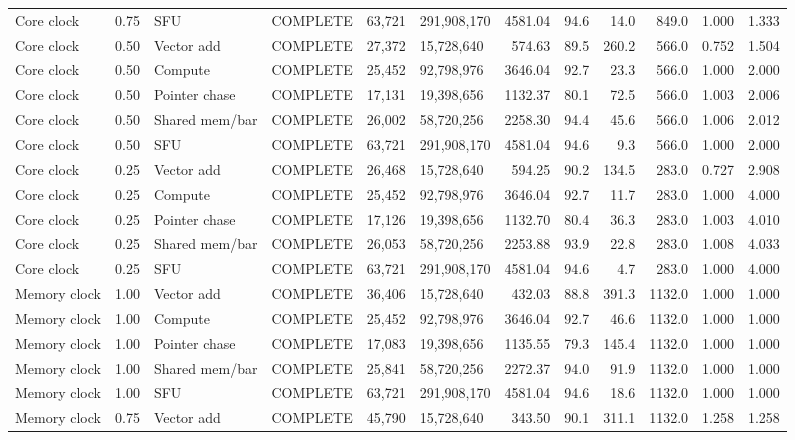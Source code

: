 \begin{landscape}
\begin{scriptsize}
\begin{longtable}{lllrllrrrrrr}
Core clock & 0.75 & SFU & COMPLETE & 63,721 & 291,908,170 & 4581.04 & 94.6 & 14.0 & 849.0 & 1.000 & 1.333 \\
Core clock & 0.50 & Vector add & COMPLETE & 27,372 & 15,728,640 & 574.63 & 89.5 & 260.2 & 566.0 & 0.752 & 1.504 \\
Core clock & 0.50 & Compute & COMPLETE & 25,452 & 92,798,976 & 3646.04 & 92.7 & 23.3 & 566.0 & 1.000 & 2.000 \\
Core clock & 0.50 & Pointer chase & COMPLETE & 17,131 & 19,398,656 & 1132.37 & 80.1 & 72.5 & 566.0 & 1.003 & 2.006 \\
Core clock & 0.50 & Shared mem/bar & COMPLETE & 26,002 & 58,720,256 & 2258.30 & 94.4 & 45.6 & 566.0 & 1.006 & 2.012 \\
Core clock & 0.50 & SFU & COMPLETE & 63,721 & 291,908,170 & 4581.04 & 94.6 & 9.3 & 566.0 & 1.000 & 2.000 \\
Core clock & 0.25 & Vector add & COMPLETE & 26,468 & 15,728,640 & 594.25 & 90.2 & 134.5 & 283.0 & 0.727 & 2.908 \\
Core clock & 0.25 & Compute & COMPLETE & 25,452 & 92,798,976 & 3646.04 & 92.7 & 11.7 & 283.0 & 1.000 & 4.000 \\
Core clock & 0.25 & Pointer chase & COMPLETE & 17,126 & 19,398,656 & 1132.70 & 80.4 & 36.3 & 283.0 & 1.003 & 4.010 \\
Core clock & 0.25 & Shared mem/bar & COMPLETE & 26,053 & 58,720,256 & 2253.88 & 93.9 & 22.8 & 283.0 & 1.008 & 4.033 \\
Core clock & 0.25 & SFU & COMPLETE & 63,721 & 291,908,170 & 4581.04 & 94.6 & 4.7 & 283.0 & 1.000 & 4.000 \\
Memory clock & 1.00 & Vector add & COMPLETE & 36,406 & 15,728,640 & 432.03 & 88.8 & 391.3 & 1132.0 & 1.000 & 1.000 \\
Memory clock & 1.00 & Compute & COMPLETE & 25,452 & 92,798,976 & 3646.04 & 92.7 & 46.6 & 1132.0 & 1.000 & 1.000 \\
Memory clock & 1.00 & Pointer chase & COMPLETE & 17,083 & 19,398,656 & 1135.55 & 79.3 & 145.4 & 1132.0 & 1.000 & 1.000 \\
Memory clock & 1.00 & Shared mem/bar & COMPLETE & 25,841 & 58,720,256 & 2272.37 & 94.0 & 91.9 & 1132.0 & 1.000 & 1.000 \\
Memory clock & 1.00 & SFU & COMPLETE & 63,721 & 291,908,170 & 4581.04 & 94.6 & 18.6 & 1132.0 & 1.000 & 1.000 \\
Memory clock & 0.75 & Vector add & COMPLETE & 45,790 & 15,728,640 & 343.50 & 90.1 & 311.1 & 1132.0 & 1.258 & 1.258 \\

\end{longtable}
\end{scriptsize}
\end{landscape}
